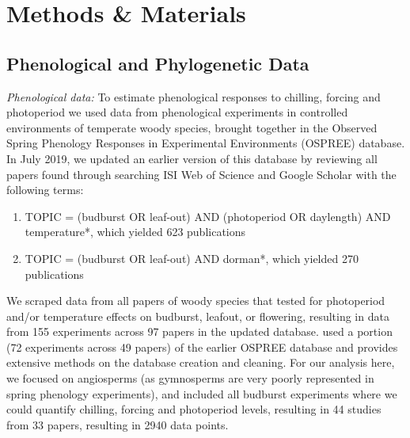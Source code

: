 \documentclass[11pt]{article}
\begin{document}
\section*{Methods \& Materials} 

\subsection*{Phenological and Phylogenetic Data}
\emph{Phenological data:} To estimate phenological responses to chilling, forcing and photoperiod we used data from phenological experiments in controlled environments of temperate woody species, brought together in the Observed Spring Phenology Responses in Experimental Environments (OSPREE) database. In July 2019, we updated an earlier version of this database \citep{wolkovich2019} by reviewing all papers found through searching ISI Web of Science and Google Scholar with the following terms: 
\begin{enumerate}
\item TOPIC = (budburst OR leaf-out) AND (photoperiod OR daylength) AND temperature*, which yielded 623 publications
\item TOPIC = (budburst OR leaf-out) AND dorman*, which yielded 270 publications
\end{enumerate}
We scraped data from all papers of woody species that tested for photoperiod and/or temperature effects on budburst, leafout, or flowering, resulting in data from 155 experiments across 97 papers in the updated database. \citet{ettinger2020} used a portion (72 experiments across 49 papers) of the earlier OSPREE database and provides extensive methods on the database creation and cleaning. For our analysis here, we focused on angiosperms (as gymnosperms are very poorly represented in spring phenology experiments), and included all budburst experiments where we could quantify chilling, forcing and photoperiod levels, resulting in 44 studies from 33 papers, resulting in 2940 data points. 
\end{document}
